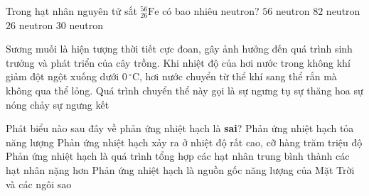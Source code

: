 	\begin{ex}%
		Trong hạt nhân nguyên tử sắt ${}^{56}_{26}\text{Fe}$ có bao nhiêu neutron?
		\choice
		{$56$ neutron}
		{$82$ neutron}
		{$26$ neutron}
		{\True $30$ neutron}
	\end{ex}

	\begin{ex}%
		Sương muối là hiện tượng thời tiết cực đoan, gây ảnh hưởng đến quá trình sinh trưởng và phát triển của cây trồng. Khi nhiệt độ của hơi nước trong không khí giảm đột ngột xuống dưới $0\,^\circ\text{C}$, hơi nước chuyển từ thể khí sang thể rắn mà không qua thể lỏng. Quá trình chuyển thể này gọi là
		\choice
		{sự ngưng tụ}
		{sự thăng hoa}
		{sự nóng chảy}
		{\True sự ngưng kết}
	\end{ex}

	\begin{ex}%
		Phát biểu nào sau đây về phản ứng nhiệt hạch là \textbf{sai}?
		\choice
		{Phản ứng nhiệt hạch tỏa năng lượng}
		{Phản ứng nhiệt hạch xảy ra ở nhiệt độ rất cao, cỡ hàng trăm triệu độ}
		{\True Phản ứng nhiệt hạch là quá trình tổng hợp các hạt nhân trung bình thành các hạt nhân nặng hơn}
		{Phản ứng nhiệt hạch là nguồn gốc năng lượng của Mặt Trời và các ngôi sao}
	\end{ex}

